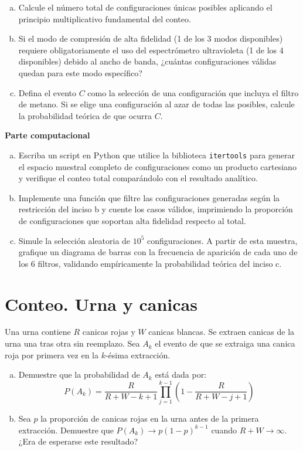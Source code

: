 \documentclass[a4paper]{article}
\begin{document}
\begin{enumerate}[a)]
\item Calcule el número total de configuraciones únicas posibles aplicando el principio multiplicativo fundamental del conteo.
\item Si el modo de compresión de alta fidelidad (1 de los 3 modos disponibles) requiere obligatoriamente el uso del espectrómetro ultravioleta (1 de los 4 disponibles) debido al ancho de banda, ¿cuántas configuraciones válidas quedan para este modo específico?
\item Defina el evento $C$ como la selección de una configuración que incluya el filtro de metano. Si se elige una configuración al azar de todas las posibles, calcule la probabilidad teórica de que ocurra $C$.
\end{enumerate}

\textbf{Parte computacional}
\begin{enumerate}[a)]
\item Escriba un script en Python que utilice la biblioteca \texttt{itertools} para generar el espacio muestral completo de configuraciones como un producto cartesiano y verifique el conteo total comparándolo con el resultado analítico.
\item Implemente una función que filtre las configuraciones generadas según la restricción del inciso b y cuente los casos válidos, imprimiendo la proporción de configuraciones que soportan alta fidelidad respecto al total.
\item Simule la selección aleatoria de $10^5$ configuraciones. A partir de esta muestra, grafique un diagrama de barras con la frecuencia de aparición de cada uno de los 6 filtros, validando empíricamente la probabilidad teórica del inciso c.
\end{enumerate}

\section{Conteo. Urna y canicas}
\label{sec:problema-25}

Una urna contiene $R$ canicas rojas y $W$ canicas blancas. Se extraen canicas de la urna una tras otra sin reemplazo. Sea $A_k$ el evento de que se extraiga una canica roja por primera vez en la $k$-ésima extracción. 

\begin{enumerate}[a)]
	\item  Demuestre que la probabilidad de $A_k$ está dada por:
$$P(A_k) = \frac{R}{R+W-k+1} \prod_{j=1}^{k-1} \left( 1 - \frac{R}{R+W-j+1} \right)$$

	\item Sea $p$ la proporción de canicas rojas en la urna antes de la primera extracción. Demuestre que $P(A_k) \to p(1-p)^{k-1}$ cuando $R+W \to \infty$. ¿Era de esperarse este resultado?
\end{enumerate}
\end{document}
